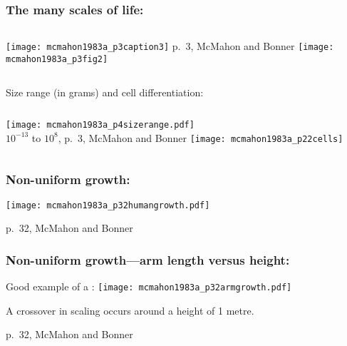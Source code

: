 \begin{frame}[plain]
  \frametitle{The many scales of life:}

  \begin{block}{}
    \begin{columns}
      \texttt{[image: mcmahon1983a\_p3caption3]}
      {\small p.\ 3, McMahon and Bonner\cite{mcmahon1983a}}
      \texttt{[image: mcmahon1983a\_p3fig2]}    
    \end{columns}
  \end{block}

\end{frame}

\begin{frame}

  \begin{block}{Size range (in grams) and cell differentiation:}
    \begin{columns}
      \texttt{[image: mcmahon1983a\_p4sizerange.pdf]}\\
      {\tiny $10^{-13}$ to $10^{8}$, p.\ 3, McMahon and Bonner\cite{mcmahon1983a}}
      \texttt{[image: mcmahon1983a\_p22cells]}
    \end{columns}
  \end{block}

  

\end{frame}


\begin{frame}
  \frametitle{Non-uniform growth:}

  \begin{block}{}
    \begin{center}
      \texttt{[image: mcmahon1983a\_p32humangrowth.pdf]}    
    \end{center}
  \end{block}
  
  \small{p.\ 32, McMahon and Bonner\cite{mcmahon1983a}}

\end{frame}

\begin{frame}
  \frametitle{Non-uniform growth---arm length versus height:}

  \begin{block}{Good example of a :}
    \texttt{[image: mcmahon1983a\_p32armgrowth.pdf]}

    A \alert{crossover} in scaling occurs around a height of 1 metre.
  \end{block}
  
  \small{p.\ 32, McMahon and Bonner\cite{mcmahon1983a}}
\end{frame}

